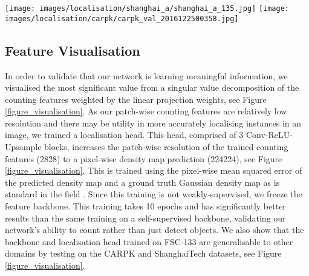 \documentclass[letterpaper, 11pt]{IEEEtran}
\begin{document}
\begin{figure*}
\texttt{[image: images/localisation/shanghai\_a/shanghai\_a\_135.jpg]}
\texttt{[image: images/localisation/carpk/carpk\_val\_2016122500358.jpg]}     \caption{\textbf{Localisation of latent counting features.} Columns 1-4: patch-wise principal components of the counting backbone features, Columns 5-8, 9, 10: pixel-wise localisation predictions of unseen dataset classes from FSC-133, CARPK and ShanghaiTech respectively. The latent counting feature density maps are generated by a localisation head trained on FSC-133.
The count and prediction of each image are in the top left and the top right respectively.  Best viewed in colour and by zooming in.
    }
    \label{figure_visualisation}
\end{figure*}
\subsection{Feature Visualisation}
\label{results_visualisation}
In order to validate that our network is learning meaningful information, we visualised the most significant value from a singular value decomposition of the counting features weighted by the linear projection weights, see Figure \ref{figure_visualisation}.
As our patch-wise counting features are relatively low resolution and there may be utility in more accurately localising instances in an image, we trained a localisation head. This head, comprised of 3 Conv-ReLU-Upsample blocks, increases the  patch-wise resolution of the trained counting features (2828) to a  pixel-wise density map prediction (224224), see Figure \ref{figure_visualisation}. This is trained using the pixel-wise mean squared error of the predicted density map and a ground truth Gaussian density map as is standard in the field \cite{ranjan2021Famnet}. Since this training is not weakly-supervised, we freeze the feature backbone. This training takes 10 epochs and has significantly better results than the same training on a self-supervised backbone, validating our network's ability to count rather than just detect objects. We also show that the backbone and localisation head trained on FSC-133 are generalisable to other domains by testing on the CARPK and ShanghaiTech \cite{zhang2016single} datasets, see Figure \ref{figure_visualisation}.
\end{document}
